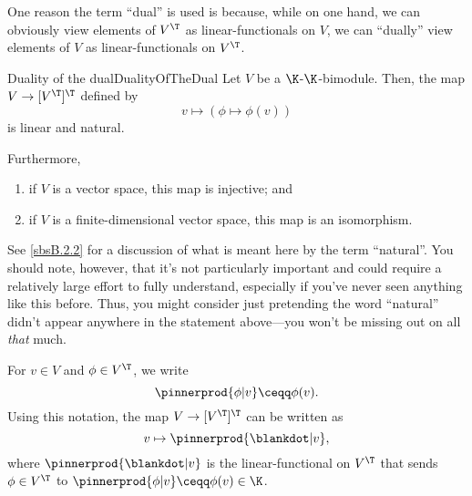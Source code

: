 One reason the term ``dual'' is used is because, while on one hand, we can obviously view elements of $V^{\T}$ as linear-functionals on $V$, we can ``dually'' view elements of $V$ as linear-functionals on $V^{\T}$.
\begin{thm}{Duality of the dual}{DualityOfTheDual}
	Let $V$ be a $\K$-$\K$-bimodule.  Then, the map $V\rightarrow [V^{\T}]^{\T}$ defined by
	\begin{equation}
		v\mapsto (\phi \mapsto \phi (v))
	\end{equation}
	is linear and natural.
	
	Furthermore,
	\begin{enumerate}
		\item \label{DualityOfTheDual(i)}if $V$ is a vector space, this map is injective; and
		\item \label{DualityOfTheDual(ii)}if $V$ is a finite-dimensional vector space, this map is an isomorphism.
	\end{enumerate}
	\begin{rmk}
		See \cref{sbsB.2.2} for a discussion of what is meant here by the term ``natural''.  You should note, however, that it's not particularly important and could require a relatively large effort to fully understand, especially if you've never seen anything like this before.  Thus, you might consider just pretending the word ``natural'' didn't appear anywhere in the statement above---you won't be missing out on all \emph{that} much.
	\end{rmk}
	\begin{rmk}
		For $v\in V$ and $\phi \in V^{\T}$, we write
		\begin{equation}
		\pinnerprod{\phi |v}\ceqq \phi (v).
		\end{equation}
		Using this notation, the map $V\rightarrow [V^{\T}]^{\T}$ can be written as
		\begin{equation}
		v\mapsto \pinnerprod{\blankdot |v},
		\end{equation}
		where $\pinnerprod{\blankdot |v}$ is the linear-functional on $V^{\T}$ that sends $\phi \in V^{\T}$ to $\pinnerprod{\phi |v}\ceqq \phi (v)\in \K$.
		

\end{rmk}
\end{thm}
